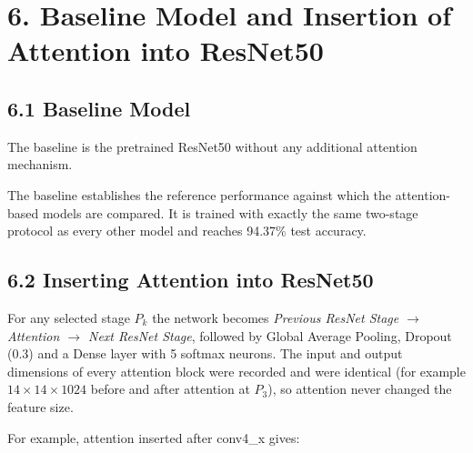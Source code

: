 \documentclass[11pt]{article}
\begin{document}
\section*{6. Baseline Model and Insertion of Attention into ResNet50}

\subsection*{6.1 Baseline Model}

The baseline is the pretrained ResNet50 without any additional attention
mechanism.

\begin{center}
\end{center}

The baseline establishes the reference performance against which the
attention-based models are compared. It is trained with exactly the same
two-stage protocol as every other model and reaches 94.37\% test accuracy.

\subsection*{6.2 Inserting Attention into ResNet50}

For any selected stage $P_k$ the network becomes
\emph{Previous ResNet Stage $\rightarrow$ Attention $\rightarrow$ Next ResNet Stage},
followed by Global Average Pooling, Dropout (0.3) and a Dense layer with 5
softmax neurons. The input and output dimensions of every attention block
were recorded and were identical (for example $14\times14\times1024$
before and after attention at $P_3$), so attention never changed the
feature size.

For example, attention inserted after conv4\_x gives:
\end{document}
